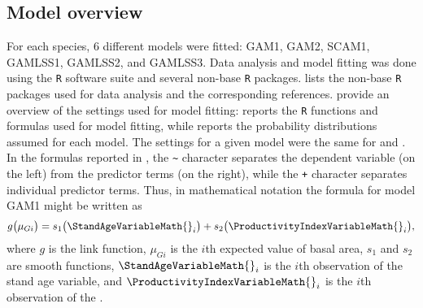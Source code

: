 \subsection{Model overview}

For each species, 6 different models were fitted: GAM1, GAM2, SCAM1, GAMLSS1,
GAMLSS2, and GAMLSS3.
Data analysis and model fitting was done using the \texttt{R} software suite \parencite{RCT2017} and several non-base \texttt{R} packages.
 lists the non-base \texttt{R} packages used for data analysis and the corresponding references.
 provide an overview of the settings used for model fitting:   reports the \texttt{R} functions and formulas used for model fitting, while  reports the probability distributions assumed for each model.
The settings for a given model were the same for \Beech{} and \Spruce{}.
In the formulas reported in , the \texttt{\textasciitilde{}} character separates the dependent variable (on the left) from the predictor terms (on the right), while the \texttt{+} character separates individual predictor terms.
Thus, in mathematical notation the formula for model GAM1 might be written as
\begin{equation}
  \label{eq:GAM1FormulaMathematicalNotation}
  g\bigl(\mu_{Gi}\bigr) = s_1\bigl(\StandAgeVariableMath{}_i\bigr) + s_2\bigl(\ProductivityIndexVariableMath{}_i\bigr),
\end{equation}
where \(g\) is the link function, \(\mu_{Gi}\) is the \(i\)th expected value of basal area, \(s_1\) and \(s_2\) are smooth functions, \(\StandAgeVariableMath{}_i\) is the \(i\)th observation of the stand age variable, and \(\ProductivityIndexVariableMath{}_i\) is the \(i\)th observation of the \ProductivityIndexVariableText{}.
